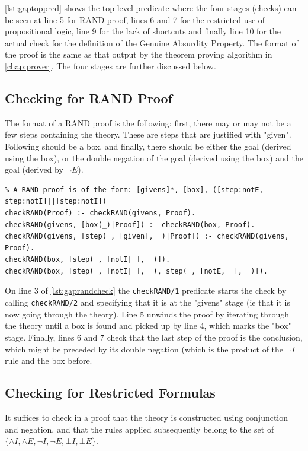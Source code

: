 \documentclass[11pt,twoside,a4paper]{report}
\begin{document}
\autoref{lst:gaptoppred} shows the top-level predicate where the four stages (checks) can be seen at line 5 for RAND proof, lines 6 and 7 for the restricted use of propositional logic, line 9 for the lack of shortcuts and finally line 10 for the actual check for the definition of the Genuine Absurdity Property. The format of the proof is the same as that output by the theorem proving algorithm in \autoref{chap:prover}. The four stages are further discussed below.

\subsection{Checking for RAND Proof}
The format of a RAND proof is the following: first, there may or may not be a few steps containing the theory. These are steps that are justified with "given". Following should be a box, and finally, there should be either the goal (derived using the box), or the double negation of the goal (derived using the box) and the goal (derived by $\neg E$).

\begin{lstlisting}[caption={Checking whether a proof is a RAND proof},label=lst:gaprandcheck]
% Checks to see if this proof is a RAND proof to start with
% A RAND proof is of the form: [givens]*, [box], ([step:notE, step:notI]||[step:notI])
checkRAND(Proof) :- checkRAND(givens, Proof).
checkRAND(givens, [box(_)|Proof]) :- checkRAND(box, Proof).
checkRAND(givens, [step(_, [given], _)|Proof]) :- checkRAND(givens, Proof).
checkRAND(box, [step(_, [notI|_], _)]).
checkRAND(box, [step(_, [notI|_], _), step(_, [notE, _], _)]).
\end{lstlisting}

On line 3 of \autoref{lst:gaprandcheck} the \lstinline$checkRAND/1$ predicate starts the check by calling \lstinline$checkRAND/2$ and specifying that it is at the "givens" stage (ie that it is now going through the theory). Line 5 unwinds the proof by iterating through the theory until a box is found and picked up by line 4, which marks the "box" stage. Finally, lines 6 and 7 check that the last step of the proof is the conclusion, which might be preceded by its double negation (which is the product of the $\neg I$ rule and the box before.

\subsection{Checking for Restricted Formulas}
It suffices to check in a proof that the theory is constructed using conjunction and negation, and that the rules applied subsequently belong to the set of $\{\wedge I, \wedge E, \neg I, \neg E, \bot I, \bot E\}$.
\end{document}
